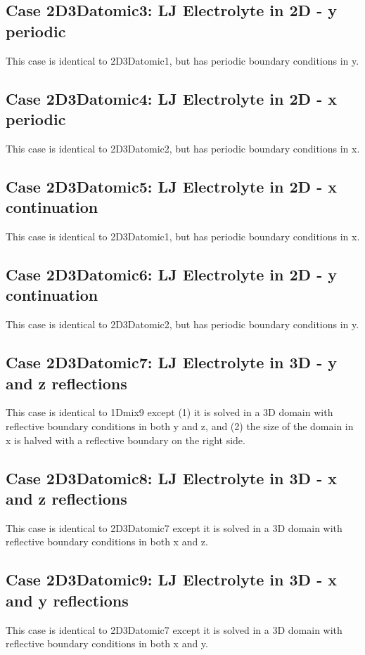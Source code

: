 \documentclass[10pt,onecolumn]{article}
\begin{document}
\subsection{Case 2D3Datomic3: LJ Electrolyte in 2D - y periodic}
This case is identical to 2D3Datomic1, but has periodic boundary conditions in y.

\subsection{Case 2D3Datomic4: LJ Electrolyte in 2D - x periodic}
This case is identical to 2D3Datomic2, but has periodic boundary conditions in x.

\subsection{Case 2D3Datomic5: LJ Electrolyte in 2D - x continuation}
This case is identical to 2D3Datomic1, but has periodic boundary conditions in x.

\subsection{Case 2D3Datomic6: LJ Electrolyte in 2D - y continuation}
This case is identical to 2D3Datomic2, but has periodic boundary conditions in y.

\subsection{Case 2D3Datomic7: LJ Electrolyte in 3D - y and z reflections}
This case is identical to 1Dmix9 except (1) it is solved in a 3D domain with reflective boundary conditions in both y and z, and (2) the size of the domain in x is halved with a reflective
boundary on the right side.

\subsection{Case 2D3Datomic8: LJ Electrolyte in 3D - x and z reflections}
This case is identical to 2D3Datomic7 except it is solved in a 3D domain 
with reflective boundary conditions in both x and z.

\subsection{Case 2D3Datomic9: LJ Electrolyte in 3D - x and y reflections}
This case is identical to 2D3Datomic7 except it is solved in a 3D domain with reflective boundary conditions in both x and y.
\end{document}
